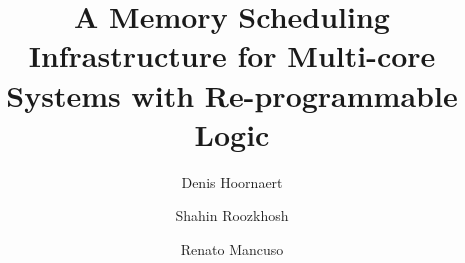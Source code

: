 \documentclass[a4paper,UKenglish,cleveref, autoref, thm-restate]{lipics-v2021}
\title{A Memory Scheduling Infrastructure for Multi-core Systems with Re-programmable Logic} %
\author{Denis Hoornaert}{Technical University of Munich, Germany}{denis.hoornaert@tum.de}{}{Denis Hoornaert was supported by an Alexander von Humboldt Professorship endowed by the German Federal Ministry of Education and Research.}
\author{Shahin Roozkhosh}{Boston University, USA}{shahin@bu.edu}{}{}
\author{Renato Mancuso}{Boston University, USA}{rmancuso@bu.edu}{}{The material presented in this paper is based upon work supported by the National Science Foundation (NSF) under grant number CCF-2008799. Any opinions, findings, and conclusions or recommendations expressed in this publication are those of the authors and do not necessarily reflect the views of the NSF.}
\begin{document}
\newcommand\schim{SchIM\xspace}
\newcommand\schimL{Scheduler In-the-Middle\xspace}
\newcommand\schiml{scheduler in-the-middle\xspace}
\newcommand\axiin[1]{$\texttt{HPM}_{#1}$\xspace}
\newcommand\axiout[1]{$\texttt{HPS}_{#1}$\xspace}
\newcommand\axiconf[1]{$\texttt{LPM}_{#1}$\xspace}

\newcommand{\new}[1]{\color{ForestGreen} #1 \color{black} }
\newcommand{\removed}[1]{\color{red} #1 \color{black}}
\newcommand{\replace}[2]{\color{red} #1 \color{ForestGreen} #2 \color{black} }


\newcommand{\newbis}[1]{\color{Purple} #1 \color{black} }
\newcommand{\removedbis}[1]{\color{red} #1 \color{black}}
\newcommand{\replacebis}[2]{\color{red} #1 \color{Purple} #2 \color{black} }


\newcommand{\fig}[1]{Fig.~\ref{#1}}

\newcommand*\circledfig[2]{Fig.~\ref{#1}\tikz[baseline=0pt]{\node[anchor=south west,red,shape=circle,draw,inner sep=1pt] (char) {\scriptsize#2};}}

\newcommand*\circled[1]{\tikz[baseline=0pt]{\node[anchor=south west,red,shape=circle,draw,inner sep=1pt] (char) {\scriptsize#1};}}

\maketitle
\end{document}
